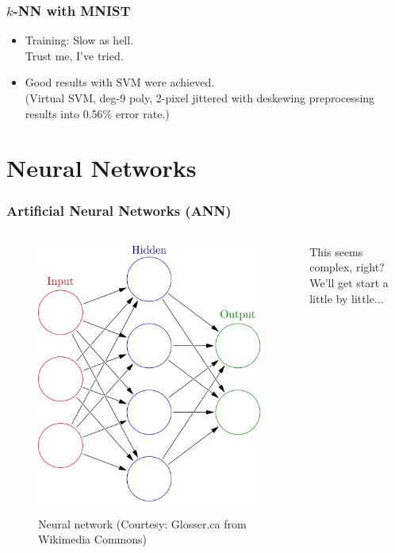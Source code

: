 \documentclass[aspectratio=169]{beamer}
\begin{document}
\begin{frame}
	\frametitle{$k$-NN with MNIST}
	\begin{itemize}
		\item Training: Slow as hell.\\
		{\tiny Trust me, I've tried.}
		\item Good results with SVM were achieved.\\
		(Virtual SVM, deg-9 poly, 2-pixel jittered with deskewing preprocessing results into 0.56\% error rate.)
	\end{itemize}
\end{frame}

\section{Neural Networks}

\begin{frame}
	\frametitle{Artificial Neural Networks (ANN)}
	\begin{columns}
		\begin{figure}
			\includegraphics[width=0.8\linewidth,height=0.8\textheight,keepaspectratio]{imgs/ann.png}
			\caption{Neural network (Courtesy: Glosser.ca from Wikimedia Commons)}
		\end{figure}
		This seems complex, right? We'll get start a little by little...
	\end{columns}
\end{frame}
\end{document}
